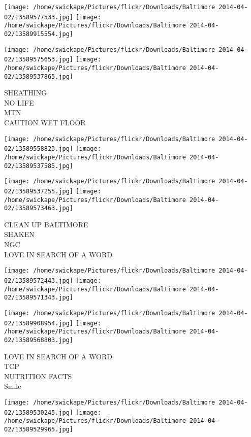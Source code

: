 \documentclass[10pt,letterpaper]{article}
\begin{document}
\texttt{[image: /home/swickape/Pictures/flickr/Downloads/Baltimore 2014-04-02/13589577533.jpg]}
\texttt{[image: /home/swickape/Pictures/flickr/Downloads/Baltimore 2014-04-02/13589915554.jpg]}

\texttt{[image: /home/swickape/Pictures/flickr/Downloads/Baltimore 2014-04-02/13589575653.jpg]}
\texttt{[image: /home/swickape/Pictures/flickr/Downloads/Baltimore 2014-04-02/13589537865.jpg]}

SHEATHING\\
NO LIFE\\
MTN\\
CAUTION WET FLOOR\\
\pagebreak

\texttt{[image: /home/swickape/Pictures/flickr/Downloads/Baltimore 2014-04-02/13589558823.jpg]}
\texttt{[image: /home/swickape/Pictures/flickr/Downloads/Baltimore 2014-04-02/13589537585.jpg]}

\texttt{[image: /home/swickape/Pictures/flickr/Downloads/Baltimore 2014-04-02/13589537255.jpg]}
\texttt{[image: /home/swickape/Pictures/flickr/Downloads/Baltimore 2014-04-02/13589573463.jpg]}

CLEAN UP BALTIMORE\\
SHAKEN\\
NGC\\
LOVE IN SEARCH OF A WORD\\
\pagebreak

\texttt{[image: /home/swickape/Pictures/flickr/Downloads/Baltimore 2014-04-02/13589572443.jpg]}
\texttt{[image: /home/swickape/Pictures/flickr/Downloads/Baltimore 2014-04-02/13589571343.jpg]}

\texttt{[image: /home/swickape/Pictures/flickr/Downloads/Baltimore 2014-04-02/13589908954.jpg]}
\texttt{[image: /home/swickape/Pictures/flickr/Downloads/Baltimore 2014-04-02/13589568803.jpg]}

LOVE IN SEARCH OF A WORD\\
TCP\\
NUTRITION FACTS\\
Smile\\
\pagebreak

\texttt{[image: /home/swickape/Pictures/flickr/Downloads/Baltimore 2014-04-02/13589530245.jpg]}
\texttt{[image: /home/swickape/Pictures/flickr/Downloads/Baltimore 2014-04-02/13589529965.jpg]}
\end{document}
